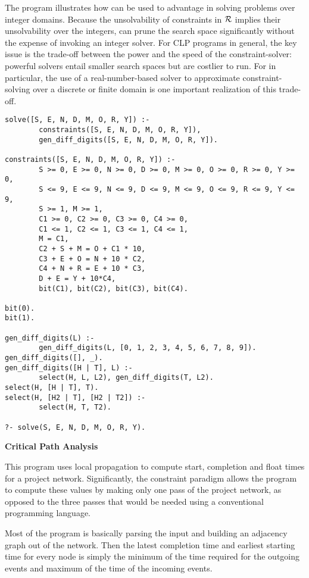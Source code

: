 The program illustrates how \CLPR{} can be used to advantage in solving
problems over integer domains.  Because the unsolvability of constraints
in $\cal R$ implies their unsolvability over the integers, \CLPR{} can 
prune the search space significantly without the expense of invoking an
integer solver.  For CLP programs in general, the key issue
is the trade-off between the power and the speed of the constraint-solver:
powerful solvers entail smaller search spaces but are
costlier to run.  For \CLPR{} in particular, the use of
a real-number-based solver to approximate constraint-solving
over a discrete or finite domain is one important realization
of this trade-off.


\begin{verbatim}
solve([S, E, N, D, M, O, R, Y]) :-
        constraints([S, E, N, D, M, O, R, Y]),
        gen_diff_digits([S, E, N, D, M, O, R, Y]).

constraints([S, E, N, D, M, O, R, Y]) :- 
        S >= 0, E >= 0, N >= 0, D >= 0, M >= 0, O >= 0, R >= 0, Y >= 0,
        S <= 9, E <= 9, N <= 9, D <= 9, M <= 9, O <= 9, R <= 9, Y <= 9,
        S >= 1, M >= 1,
        C1 >= 0, C2 >= 0, C3 >= 0, C4 >= 0,
        C1 <= 1, C2 <= 1, C3 <= 1, C4 <= 1,
        M = C1,
        C2 + S + M = O + C1 * 10,
        C3 + E + O = N + 10 * C2,
        C4 + N + R = E + 10 * C3,
        D + E = Y + 10*C4,
        bit(C1), bit(C2), bit(C3), bit(C4).

bit(0).
bit(1).

gen_diff_digits(L) :- 
        gen_diff_digits(L, [0, 1, 2, 3, 4, 5, 6, 7, 8, 9]).
gen_diff_digits([], _).
gen_diff_digits([H | T], L) :- 
        select(H, L, L2), gen_diff_digits(T, L2).
select(H, [H | T], T).
select(H, [H2 | T], [H2 | T2]) :- 
        select(H, T, T2). 

?- solve(S, E, N, D, M, O, R, Y).
\end{verbatim}

\noindent
{\bf Critical Path Analysis}

This program uses local propagation to compute start, completion and float
times for a project network. Significantly, the constraint paradigm allows the
program to compute these values by making only one pass of the project
network, as opposed to the three passes that would be needed using a
conventional programming language.

Most of the program is basically parsing the input and building
an adjacency graph out of the network. Then the latest completion
time and earliest starting time for every node is simply the
minimum of the time required for the outgoing events and maximum of
the time of the incoming events.

